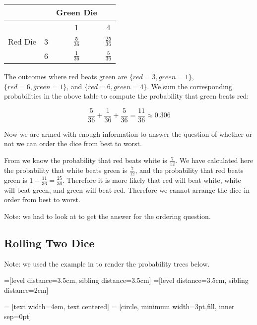 \documentclass[a4paper,11pt]{article}
\begin{document}
\begin{center}
  \begin{tabular}{ | c | c | c | c| }
    \hline
     & & Green Die & \\ \hline
    & & 1 & 4 \\ \hline
    Red Die & 3 & $\frac{5}{36}$ & $\frac{25}{36}$\\ \hline
     & 6 & $\frac{1}{36}$ & $\frac{5}{36}$ \\ \hline
  \end{tabular}
\end{center}

The outcomes where red beats green are $\{red=3,green=1\}$, 
$\{red=6, green=1\}$, and $\{red=6, green=4\}$.  We sum 
the corresponding probabilities in the above table to compute
the probability that green beats red:

\begin{equation}
\frac{5}{36} + \frac{1}{36} + \frac{5}{36} = \frac{11}{36}
\approx 0.306
\end{equation}

Now we are armed with enough information to answer the question 
of whether or not we can order the dice from best to worst.

From \cite{classSlides2} we know the probability that red beats
white is $\frac{7}{12}$.  We have calculated here the probability that
white beats green is $\frac{7}{12}$, and the probability that red
beats green is $1-\frac{11}{36}=\frac{25}{36}$.  Therefore it is more
likely that red will beat white, white will beat green, and green will
beat red.  Therefore we cannot arrange the dice in order from best to
worst.

Note: we had to look at \cite{probSet1Solutions} to get the answer for
the ordering question.

\subsection{Rolling Two Dice}
Note: we used the example in \cite{probTreeHowTo} to render the
probability trees below.

=[level distance=3.5cm, sibling distance=3.5cm]
=[level distance=3.5cm, sibling distance=2cm]

 = [text width=4em, text centered]
 = [circle, minimum width=3pt,fill, inner sep=0pt]
\end{document}
